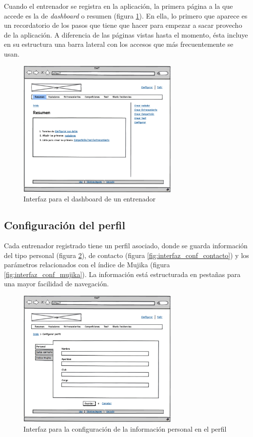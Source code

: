   	Cuando el entrenador se registra en la aplicación, la primera página a la que accede es la de {\it dashboard} o resumen (figura \ref{fig:interfaz_dashboard}). En ella, lo primero que aparece es un recordatorio de los pasos que tiene que hacer para empezar a sacar provecho de la aplicación. A diferencia de las páginas vistas hasta el momento, ésta incluye en su estructura una barra lateral con los accesos que más frecuentemente se usan.

  		\begin{figure}[H]
  		  \centering
  		    \includegraphics[width=8cm]{./eps/p_interfaz/6_Dashboard.eps}
  		  \caption{Interfaz para el dashboard de un entrenador}
  		  \label{fig:interfaz_dashboard}
  		\end{figure}


  	\subsection{Configuración del perfil} %
  		\label{sub:configuracion_del_perfil}

  	Cada entrenador registrado tiene un perfil asociado, donde se guarda información del tipo personal (figura \ref{fig:interfaz_conf_personal}), de contacto (figura \ref{fig:interfaz_conf_contacto}) y los parámetros relacionados con el índice de Mujika (figura \ref{fig:interfaz_conf_mujika}). La información está estructurada en pestañas para una mayor facilidad de navegación.

  		\begin{figure}[H]
  		  \centering
  		    \includegraphics[width=8cm]{./eps/p_interfaz/7_Conf_personal.eps}
  		  \caption{Interfaz para la configuración de la información personal en el perfil}
  		  \label{fig:interfaz_conf_personal}
  		\end{figure}

